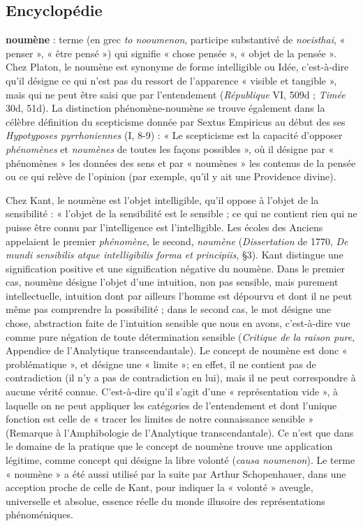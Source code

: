 \subsection{Encyclopédie}
{\bf noumène} : terme (en grec {\it to nooumenon},
participe substantivé de {\it noeisthai}, « penser »,
« être pensé ») qui signifie « chose
pensée », « objet de la pensée ». Chez Platon,
le noumène est synonyme de forme
intelligible ou Idée, c’est-à-dire qu’il
désigne ce qui n’est pas du ressort de l’apparence
« visible et tangible », mais qui ne
peut être saisi que par l’entendement
({\it République} VI, 509d ; {\it Timée} 30d, 51d).
La distinction phénomène-noumène se
trouve également dans la célèbre définition
du scepticisme donnée par Sextus
Empiricus au début des ses {\it Hypotyposes
pyrrhoniennes} (I, 8-9) : « Le scepticisme
est la capacité d’opposer {\it phénomènes} et
{\it noumènes} de toutes les façons possibles »,
où il désigne par « phénomènes » les données
des sens et par « noumènes » les
contenus de la pensée ou ce qui relève de
l'opinion (par exemple, qu’il y ait une
Providence divine).

Chez Kant, le noumène est l’objet intelligible,
qu’il oppose à l’objet de la sensibilité :
« l’objet de la sensibilité est le
sensible ; ce qui ne contient rien qui ne
puisse être connu par l'intelligence est
l’intelligible. Les écoles des Anciens
appelaient le premier {\it phénomène}, le
second, {\it noumène} ({\it Dissertation} de 1770,
{\it De mundi sensibilis atque intelligibilis
forma et principiis}, \S 3). Kant distingue
une signification positive et une signification
négative du noumène. Dans le premier cas,
noumène désigne l’objet d’une
intuition, non pas sensible, mais purement
intellectuelle, intuition dont par ailleurs
l’homme est dépourvu et dont il ne peut
même pas comprendre la possibilité ; dans
le second cas, le mot désigne une chose,
abstraction faite de l'intuition sensible
que nous en avons, c’est-à-dire vue
comme pure négation de toute détermination
sensible ({\it Critique de la raison pure},
Appendice de l’Analytique transcendantale).
Le concept de noumène est donc
« problématique », et désigne une « limite »;
en effet, il ne contient pas de
contradiction (il n’y a pas de contradiction en lui),
mais il ne peut correspondre
à aucune vérité connue. C’est-à-dire qu’il
s’agit d’une « représentation vide », à
laquelle on ne peut appliquer les catégories
de l’entendement et dont l'unique
fonction est celle de « tracer les limites de
notre connaissance sensible » (Remarque
à l’Amphibologie de l’Analytique transcendantale).
Ce n’est que dans le domaine
de la pratique que le concept de noumène
trouve une application légitime, comme
concept qui désigne la libre volonté
({\it causa noumenon}). Le terme « noumène »
a été aussi utilisé par la suite par
Arthur Schopenhauer, dans une acception
proche de celle de Kant, pour indiquer
la « volonté » aveugle, universelle et
absolue, essence réelle du monde illusoire
des représentations phénoméniques.

